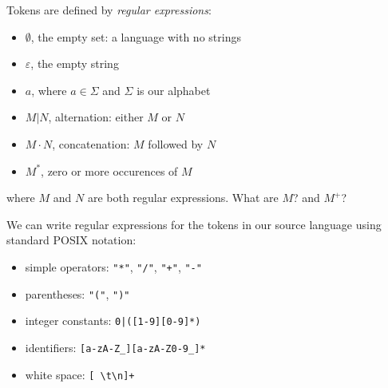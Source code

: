 \begin{slide*}
Tokens are defined by {\em regular expressions}:
\begin{itemize}
\item $\emptyset$, the empty set: a language with no strings
\item $\varepsilon$, the empty string
\item $a$, where $a \in \Sigma$ and $\Sigma$ is our alphabet
\item $M | N$, alternation: either $M$ or $N$
\item $M \cdot N$, concatenation: $M$ followed by $N$
\item $M^{*}$, zero or more occurences of $M$
\end{itemize}
where $M$ and $N$ are both regular expressions.  What are $M$? and $M^{+}$?

\vspace{.2in}

We can write regular expressions for the
tokens in our source language using standard POSIX notation: 
\begin{itemize}
\item simple operators: \verb:"*":, \verb:"/":, \verb:"+":, \verb:"-":
\item parentheses: \verb:"(":, \verb:")":
\item integer constants: \verb:0|([1-9][0-9]*):
\item identifiers: \verb:[a-zA-Z_][a-zA-Z0-9_]*:
\item white space: \verb*:[ \t\n]+:
\end{itemize}

\vfil
\end{slide*}

